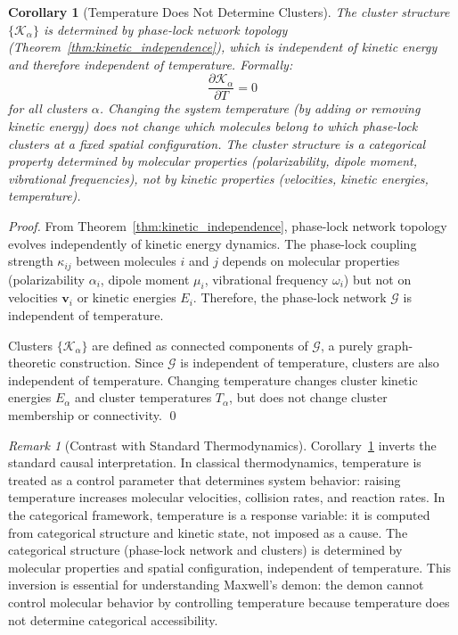 \documentclass[12pt,a4paper]{article}
\newtheorem{corollary}[theorem]{Corollary}
\theoremstyle{definition}
\theoremstyle{remark}
\newtheorem{remark}[theorem]{Remark}
\newcommand{\phaselockgraph}{\mathcal{G}}
\begin{document}
\begin{corollary}[Temperature Does Not Determine Clusters]
\label{cor:temperature_not_causal}
The cluster structure $\{\mathcal{K}_\alpha\}$ is determined by phase-lock network topology (Theorem~\ref{thm:kinetic_independence}), which is independent of kinetic energy and therefore independent of temperature. Formally:
\begin{equation}
\frac{\partial \mathcal{K}_\alpha}{\partial T} = 0
\end{equation}
for all clusters $\alpha$. Changing the system temperature (by adding or removing kinetic energy) does not change which molecules belong to which phase-lock clusters at a fixed spatial configuration. The cluster structure is a categorical property determined by molecular properties (polarizability, dipole moment, vibrational frequencies), not by kinetic properties (velocities, kinetic energies, temperature).
\end{corollary}

\begin{proof}
From Theorem~\ref{thm:kinetic_independence}, phase-lock network topology evolves independently of kinetic energy dynamics. The phase-lock coupling strength $\kappa_{ij}$ between molecules $i$ and $j$ depends on molecular properties (polarizability $\alpha_i$, dipole moment $\mu_i$, vibrational frequency $\omega_i$) but not on velocities $\mathbf{v}_i$ or kinetic energies $E_i$. Therefore, the phase-lock network $\phaselockgraph$ is independent of temperature.

Clusters $\{\mathcal{K}_\alpha\}$ are defined as connected components of $\phaselockgraph$, a purely graph-theoretic construction. Since $\phaselockgraph$ is independent of temperature, clusters are also independent of temperature. Changing temperature changes cluster kinetic energies $E_\alpha$ and cluster temperatures $T_\alpha$, but does not change cluster membership or connectivity. \qed
\end{proof}

\begin{remark}[Contrast with Standard Thermodynamics]
\label{rem:contrast_standard}
Corollary~\ref{cor:temperature_not_causal} inverts the standard causal interpretation. In classical thermodynamics, temperature is treated as a control parameter that determines system behavior: raising temperature increases molecular velocities, collision rates, and reaction rates. In the categorical framework, temperature is a response variable: it is computed from categorical structure and kinetic state, not imposed as a cause. The categorical structure (phase-lock network and clusters) is determined by molecular properties and spatial configuration, independent of temperature. This inversion is essential for understanding Maxwell's demon: the demon cannot control molecular behavior by controlling temperature because temperature does not determine categorical accessibility.
\end{remark}
\end{document}
